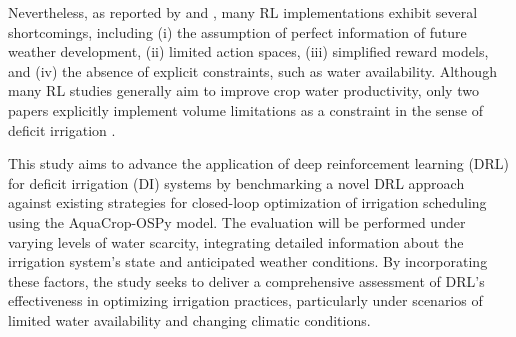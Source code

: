 \documentclass{scrartcl}
\begin{document}
Nevertheless, as reported by \citet{Saikai2023} and \citet{Kelly2024}, many RL implementations exhibit several shortcomings, including (i) the assumption of perfect information of future weather development, (ii) limited action spaces, (iii) simplified reward models, and (iv) the absence of explicit constraints, such as water availability. Although many RL studies generally aim to improve crop water productivity, only two papers explicitly implement volume limitations as a constraint in the sense of deficit irrigation \citep{Schuetze2011,Kelly2024}.

This study aims to advance the application of deep reinforcement learning (DRL) for deficit irrigation (DI) systems by benchmarking a novel DRL approach against existing strategies for closed-loop optimization of irrigation scheduling using the AquaCrop-OSPy model. The evaluation will be performed under varying levels of water scarcity, integrating detailed information about the irrigation system’s state and anticipated weather conditions. By incorporating these factors, the study seeks to deliver a comprehensive assessment of DRL’s effectiveness in optimizing irrigation practices, particularly under scenarios of limited water availability and changing climatic conditions.



\end{document}
